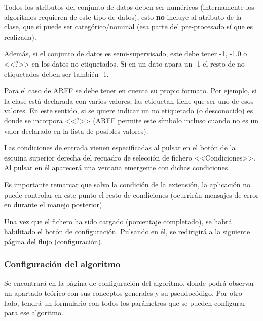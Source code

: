 \begin{tcolorbox}[colback=red!5!white,colframe=red!75!black,fontupper=\footnotesize,title=Requisito fundamental]
Todos los atributos del conjunto de datos deben ser numéricos (internamente los
algoritmos requieren de este tipo de datos), esto \textbf{no} incluye al
atributo de la clase, que sí puede ser categórico/nominal (esa parte del
pre-procesado sí que es realizada).
\end{tcolorbox}

Además, si el conjunto de datos es semi-supervisado, este debe tener -1, -1.0 o
<<?>> en los datos no etiquetados. Si en un dato apara un -1 el resto de no
etiquetados deben ser también -1.

Para el caso de ARFF se debe tener en cuenta su propio formato. Por ejemplo, si
la clase está declarada con varios valores, las etiquetan tiene que ser uno de
esos valores. En este sentido, si se quiere indicar un no etiquetado (o
desconocido) es donde se incorpora <<?>> (ARFF permite este símbolo incluso
cuando no es un valor declarado en la lista de posibles valores).

Las condiciones de entrada vienen especificadas al pulsar en el botón de la
esquina superior derecha del recuadro de selección de fichero <<Condiciones>>.
Al pulsar en él aparecerá una ventana emergente con dichas condiciones.


Es importante remarcar que salvo la condición de la extensión, la aplicación no
puede controlar en este punto el resto de condiciones (ocurrirán mensajes de
error en durante el manejo posterior).

Una vez que el fichero ha sido cargado (porcentaje completado), se habrá
habilitado el botón de configuración. Pulsando en él, se redirigirá a la
siguiente página del flujo (configuración).

\subsubsection{Configuración del algoritmo}
\label{mu:configuracion}
Se encontrará en la página de configuración del algoritmo, donde podrá observar
un apartado teórico con sus conceptos generales y su pseudocódigo. Por otro
lado, tendrá un formulario con todos los parámetros que se pueden configurar
para ese algoritmo.


